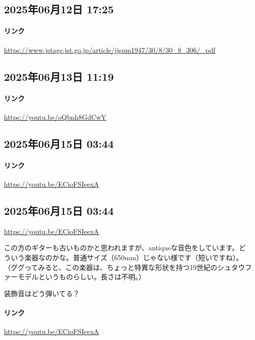 \subsection*{2025年06月12日 17:25}

\paragraph{リンク}
\url{https://www.jstage.jst.go.jp/article/jjspm1947/30/8/30_8_306/_pdf}

\subsection*{2025年06月13日 11:19}

\paragraph{リンク}
\url{https://youtu.be/oQbnh8GdCwY}

\subsection*{2025年06月15日 03:44}

\paragraph{リンク}
\url{https://youtu.be/ECioFSIeexA}

\subsection*{2025年06月15日 03:44}

\url{https://youtu.be/ECioFSIeexA}

この方のギターも古いものかと思われますが、antiqueな音色をしています。どういう楽器なのかな。普通サイズ（650mm）じゃない様です（短いですね）。（ググってみると、この楽器は、ちょっと特異な形状を持つ19世紀のシュタウファーモデルというものらしい。長さは不明。）

装飾音はどう弾いてる？

\paragraph{リンク}
\url{https://youtu.be/ECioFSIeexA}

